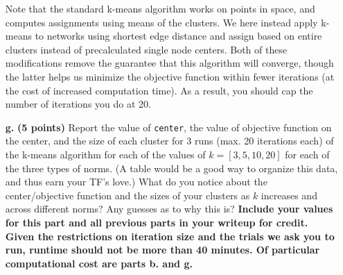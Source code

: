 \documentclass[11pt]{article}
\newcommand{\code}[1]{\texttt{#1}}
\begin{document}
\begin{enumerate}
    Note that the standard k-means algorithm works on points in space, and computes assignments using means of the clusters. We here instead apply k-means to networks using shortest edge distance and assign based on entire clusters instead of precalculated single node centers. Both of these modifications remove the guarantee that this algorithm will converge, though the latter helps us minimize the objective function within fewer iterations (at the cost of increased computation time). As a result, you should cap the number of iterations you do at 20.

    \item[\textbf{g.}] \textbf{(5 points)} Report the value of \code{center}, the value of objective function on the center, and the size of each cluster for 3 runs (max. 20 iterations each) of the k-means algorithm for each of the values of $k=[3, 5, 10, 20]$ for each of the three types of norms. (A table would be a good way to organize this data, and thus earn your TF's love.) What do you notice about the center/objective function and the sizes of your clusters as $k$ increases and across different norms? Any guesses as to why this is? \textbf{Include your values for this part and all previous parts in your writeup for credit. Given the restrictions on iteration size and the trials we ask you to run, runtime should not be more than 40 minutes. Of particular computational cost are parts \textbf{b.} and \textbf{g.}}

\end{enumerate}
\end{document}
